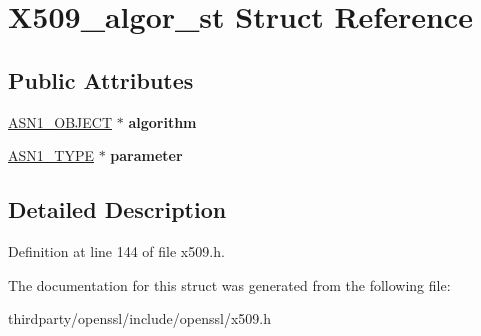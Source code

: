 \hypertarget{struct_x509__algor__st}{}\section{X509\+\_\+algor\+\_\+st Struct Reference}
\label{struct_x509__algor__st}
\subsection*{Public Attributes}
\begin{DoxyCompactItemize}
\item 
\mbox{\label{struct_x509__algor__st_a79eaee9147e50e87d311ccd20f781960}} 
\hyperlink{structasn1__object__st}{A\+S\+N1\+\_\+\+O\+B\+J\+E\+CT} $\ast$ {\bfseries algorithm}
\item 
\mbox{\label{struct_x509__algor__st_a0c0f294d859665c5b1e6d86c695ac4e1}} 
\hyperlink{structasn1__type__st}{A\+S\+N1\+\_\+\+T\+Y\+PE} $\ast$ {\bfseries parameter}
\end{DoxyCompactItemize}


\subsection{Detailed Description}


Definition at line 144 of file x509.\+h.



The documentation for this struct was generated from the following file\+:\begin{DoxyCompactItemize}
\item 
thirdparty/openssl/include/openssl/x509.\+h\end{DoxyCompactItemize}
